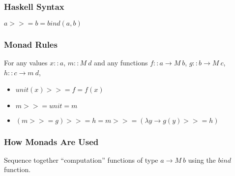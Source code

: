 \documentclass[presentation.tex]{subfiles}
\begin{document}
\begin{frame}
  \frametitle{Haskell Syntax}
  $a >>= b = bind(a, b)$
\end{frame}

\begin{frame}
  \frametitle{Monad Rules}
  For any values $x::a$, $m::M\ d$ and any functions $f::a \rightarrow M\ b$, $g::b \rightarrow M\ c$, $h::c \rightarrow m\ d$,
  \begin{itemize}
  \item
    $unit(x) >>= f = f(x)$
  \item
    $m >>= unit = m$
  \item
    $(m >>= g) >>= h = m >>= (\lambda y \rightarrow g(y) >>= h)$
  \end{itemize}
\end{frame}

\begin{frame}
  \frametitle{How Monads Are Used}

  Sequence together ``computation'' functions of type $a \rightarrow
  M\ b$ using the $bind$ function.
\end{frame}
\end{document}
